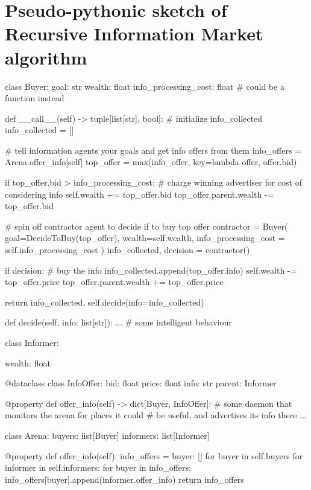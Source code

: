 \section{Pseudo-pythonic sketch of Recursive Information Market algorithm}
\label{rim/app:rim}

\begin{python}
class Buyer:
    goal: str
    wealth: float
    info_processing_cost: float # could be a function instead

    def __call__(self) -> tuple[list[str], bool]:
        # initialize info_collected
        info_collected = []

        # tell information agents your goals and get info offers from them
        info_offers = Arena.offer_info[self]
        top_offer = max(info_offer, key=lambda offer, offer.bid)

        if top_offer.bid > info_processing_cost:
            # charge winning advertiser for cost of considering info
            self.wealth += top_offer.bid
            top_offer.parent.wealth -= top_offer.bid

            # spin off contractor agent to decide if to buy top offer
            contractor = Buyer(
                goal=DecideToBuy(top_offer),
                wealth=self.wealth,
                info_processing_cost = self.info_processing_cost
            )
            info_collected, decision = contractor()

            if decision:
                # buy the info
                info_collected.append(top_offer.info)
                self.wealth -= top_offer.price
                top_offer.parent.wealth += top_offer.price

        return info_collected, self.decide(info=info_collected)

    def decide(self, info: list[str]):
        ... # some intelligent behaviour

class Informer:

    wealth: float

    @dataclass
    class InfoOffer:
        bid: float
        price: float
        info: str
        parent: Informer

    @property
    def offer_info(self) -> dict[Buyer, InfoOffer]:
        # some daemon that monitors the arena for places it could
        # be useful, and advertises its info there
        ...

class Arena:
    buyers: list[Buyer]
    informers: list[Informer]

    @property
        def offer_info(self):
        info_offers = {buyer: [] for buyer in self.buyers}
        for informer in self.informers:
            for buyer in info_offers:
                info_offers[buyer].append(informer.offer_info)
        return info_offers

\end{python}